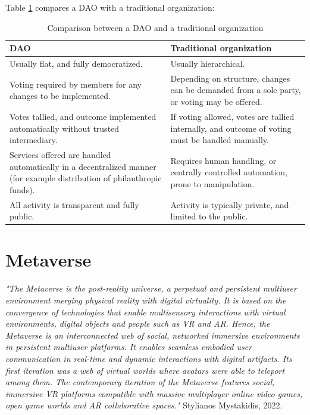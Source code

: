 \documentclass[MSE,Master,english]{twbook}%
\begin{document}
Table \ref{table:DAOComparison} compares a DAO with a traditional organization:
\begin{center}
  \begin{table}[H]
    \begin{tabular}{ | m{20em} | m{20em} | }
      \hline
      \textbf{DAO} & \textbf{Traditional organization} \\ 
      \hline
      Usually flat, and fully democratized. & Usually hierarchical. \\
      \hline  
      Voting required by members for any changes to be implemented. & Depending on structure, changes can be demanded from a sole party, or voting may be offered. \\
      \hline
      Votes tallied, and outcome implemented automatically without trusted intermediary. & If voting allowed, votes are tallied internally, and outcome of voting must be handled manually. \\
      \hline
      Services offered are handled automatically in a decentralized manner (for example distribution of philanthropic funds). & Requires human handling, or centrally controlled automation, prone to manipulation. \\
      \hline
      All activity is transparent and fully public. & Activity is typically private, and limited to the public. \\
      \hline
    \end{tabular}
    \caption{Comparison between a DAO and a traditional organization \cite{DAO}}
    \label{table:DAOComparison}
  \end{table}
\end{center}

\section{Metaverse}
\emph{"The Metaverse is the post-reality universe, a perpetual and persistent multiuser environment merging physical reality with digital virtuality. It is based on the convergence of technologies that enable multisensory interactions with virtual environments, digital objects and people such as \ac{VR} and \ac{AR}. Hence, the Metaverse is an interconnected web of social, networked immersive environments in persistent multiuser platforms. It enables seamless embodied user communication in real-time and dynamic interactions with digital artifacts. Its first iteration was a web of virtual worlds where avatars were able to teleport among them. The contemporary iteration of the Metaverse features social, immersive VR platforms compatible with massive multiplayer online video games, open game worlds and AR collaborative spaces."} Stylianos Mystakidis, 2022. \cite{metaverse} \\
\end{document}
